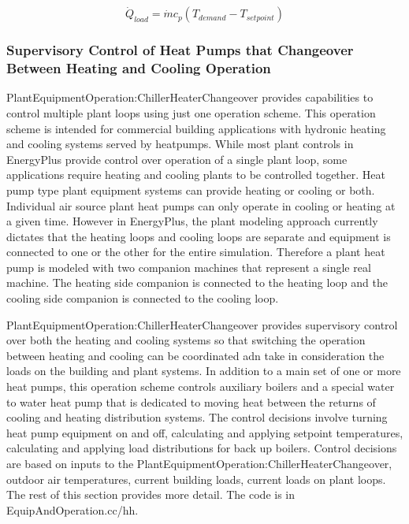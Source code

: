 \begin{equation}
\dot Q_{load} = {\dot m}{c_p}( {T_{demand} - T_{setpoint}} )
\end{equation}

\subsubsection{Supervisory Control of Heat Pumps that Changeover Between Heating and Cooling Operation}\label{supervisory-changeover-heating-cooling-operation}

PlantEquipmentOperation:ChillerHeaterChangeover provides capabilities to control multiple plant loops using just one operation scheme. This operation scheme is intended for commercial building applications with hydronic heating and cooling systems served by heatpumps. While most plant controls in EnergyPlus provide control over operation of a single plant loop, some applications require heating and cooling plants to be controlled together.  Heat pump type plant equipment systems can provide heating or cooling or both. Individual air source plant heat pumps can only operate in cooling or heating at a given time.  However in EnergyPlus, the plant modeling approach currently dictates that the heating loops and cooling loops are separate and equipment is connected to one or the other for the entire simulation. Therefore a plant heat pump is modeled with two companion machines that represent a single real machine.  The heating side companion is connected to the heating loop and the cooling side companion is connected to the cooling loop.

PlantEquipmentOperation:ChillerHeaterChangeover provides supervisory control over both the heating and cooling systems so that switching the operation between heating and cooling can be coordinated adn take in consideration the loads on the building and plant systems. In addition to a main set of one or more heat pumps, this operation scheme controls auxiliary boilers and a special water to water heat pump that is dedicated to moving heat between the returns of cooling and heating distribution systems.  The control decisions involve turning heat pump equipment on and off, calculating and applying setpoint temperatures, calculating and applying load distributions for back up boilers. Control decisions are based on inputs to the PlantEquipmentOperation:ChillerHeaterChangeover, outdoor air temperatures, current building loads, current loads on plant loops.  The rest of this section provides more detail. The code is in EquipAndOperation.cc/hh.

